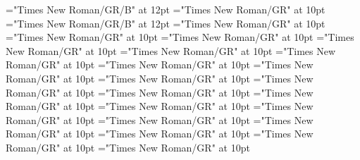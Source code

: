 \documentclass[gps1,twoside]{article}
\begin{document}
\font\spanbzhheadwordreferencedentryreferencedentriescomplexformentryrefcomplexformentryrefsminorentrycomplex="Times New Roman/GR/B" at 12pt
\font\spanspanheadwordreferencedentryreferencedentriescomplexformentryrefcomplexformentryrefsminorentrycomplexbefore="Times New Roman/GR" at 10pt
\font\spanheadwordreferencedentryreferencedentriescomplexformentryrefcomplexformentryrefsminorentrycomplex="Times New Roman/GR/B" at 12pt
\font\spanspandefinitionorglossreferencedentryreferencedentriescomplexformentryrefcomplexformentryrefsminorentrycomplexbefore="Times New Roman/GR" at 10pt
\font\spandefinitionorglossreferencedentryreferencedentriescomplexformentryrefcomplexformentryrefsminorentrycomplexfirstchildbefore="Times New Roman/GR" at 10pt
\font\spanspansummarycomplexformentryrefcomplexformentryrefsminorentrycomplexbefore="Times New Roman/GR" at 10pt
\font\spansummarycomplexformentryrefcomplexformentryrefsminorentrycomplexfirstchildbefore="Times New Roman/GR" at 10pt
\font\nontrivialentryrootnontrivialentryrootnontrivialentryrootscomplexformentryrefcomplexformentryrefsminorentrycomplexbefore="Times New Roman/GR" at 10pt
\font\nontrivialentryrootscomplexformentryrefcomplexformentryrefsminorentrycomplexbefore="Times New Roman/GR" at 10pt
\font\spanspansummarydefinitionminorentrycomplexbefore="Times New Roman/GR" at 10pt
\font\spansummarydefinitionminorentrycomplexfirstchildbefore="Times New Roman/GR" at 10pt
\font\spansummarydefinitionminorentrycomplexlastchildafter="Times New Roman/GR" at 10pt
\font\spanspanvisiblecomplexformbackrefsminorentrycomplexbefore="Times New Roman/GR" at 10pt
\font\visiblecomplexformbackrefsminorentrycomplexbefore="Times New Roman/GR" at 10pt
\font\visiblecomplexformbackrefsminorentrycomplexafter="Times New Roman/GR" at 10pt
\font\complexformtypesvisiblecomplexformbackrefvisiblecomplexformbackrefsminorentrycomplexafter="Times New Roman/GR" at 10pt
\font\spanspanreverseabbrcomplexformtypecomplexformtypesvisiblecomplexformbackrefvisiblecomplexformbackrefsminorentrycomplexbefore="Times New Roman/GR" at 10pt
\font\spanspanheadwordvisiblecomplexformbackrefvisiblecomplexformbackrefsminorentrycomplexbefore="Times New Roman/GR" at 10pt
\font\spanspandefinitionorglossesvisiblecomplexformbackrefvisiblecomplexformbackrefsminorentrycomplexbefore="Times New Roman/GR" at 10pt
\font{}="Times New Roman/GR" at 10pt
\font\spanspanowningentrysummarydefinitionvisiblecomplexformbackrefvisiblecomplexformbackrefsminorentrycomplexbefore="Times New Roman/GR" at 10pt
\font\spanowningentrysummarydefinitionvisiblecomplexformbackrefvisiblecomplexformbackrefsminorentrycomplexfirstchildbefore="Times New Roman/GR" at 10pt
\end{document}
